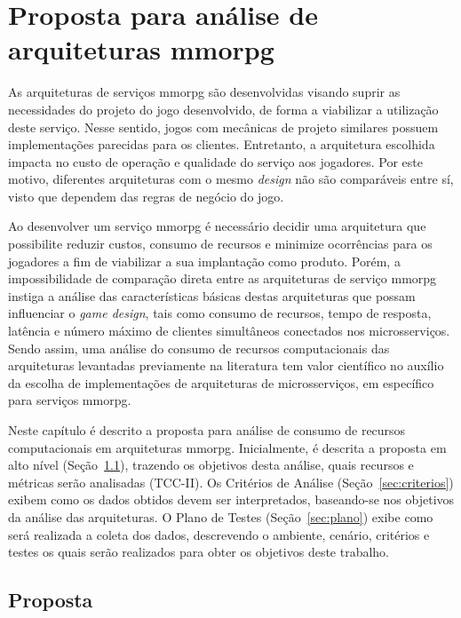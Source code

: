 \chapter{Proposta para análise de arquiteturas \ac{mmorpg}}
\label{cap3}



As arquiteturas de serviços \ac{mmorpg} são desenvolvidas visando suprir as necessidades do projeto do jogo desenvolvido, de forma a viabilizar a utilização deste serviço.
%
Nesse sentido, jogos com mecânicas de projeto similares possuem implementações parecidas para os clientes.
%
Entretanto, a arquitetura escolhida impacta no custo de operação e qualidade do serviço aos jogadores.
%
Por este motivo, diferentes arquiteturas com o mesmo \textit{design} não são comparáveis entre sí, visto que dependem das regras de negócio do jogo.



Ao desenvolver um serviço \ac{mmorpg} é necessário decidir uma arquitetura que possibilite reduzir custos, consumo de recursos e minimize ocorrências para os jogadores a fim de viabilizar a sua implantação como produto.
%
Porém, a impossibilidade de comparação direta entre as arquiteturas de serviço \ac{mmorpg} instiga a análise das características básicas destas arquiteturas que possam influenciar o \textit{game design}, tais como consumo de recursos, tempo de resposta, latência e número máximo de clientes simultâneos conectados nos microsserviços.
%
Sendo assim, uma análise do consumo de recursos computacionais das arquiteturas levantadas previamente na literatura tem valor científico no auxílio da escolha de implementações de arquiteturas de microsserviços, em específico para serviços \ac{mmorpg}.



Neste capítulo é descrito a proposta para análise de consumo de recursos computacionais em arquiteturas \ac{mmorpg}.
%
Inicialmente, é descrita a proposta em alto nível (Seção~\ref{sec:proposta}), trazendo os objetivos desta análise, quais recursos e métricas serão analisadas (TCC-II).
%
Os Critérios de Análise (Seção~\ref{sec:criterios}) exibem como os dados obtidos devem ser interpretados, baseando-se nos objetivos da análise das arquiteturas.
%
O Plano de Testes (Seção~\ref{sec:plano}) exibe como será realizada a coleta dos dados, descrevendo o ambiente, cenário, critérios e testes os quais serão realizados para obter os objetivos deste trabalho.
%

\section{Proposta}
\label{sec:proposta}

